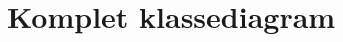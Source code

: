 \section{Komplet klassediagram}
\label{kompletKlassediagram}

\begin{figure}[t]
{}
    \label{fig:Klassediagram}
\end{figure}